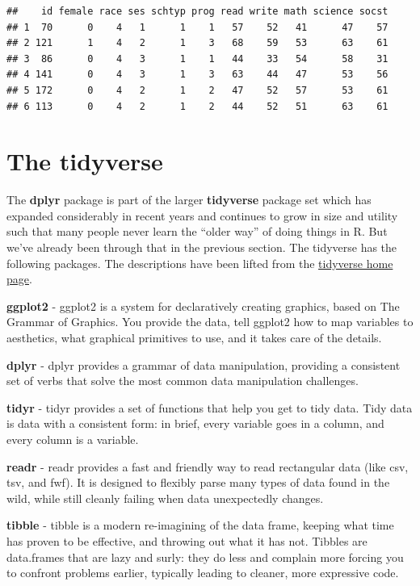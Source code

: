 \documentclass[]{book}
\begin{document}
\begin{verbatim}
##    id female race ses schtyp prog read write math science socst
## 1  70      0    4   1      1    1   57    52   41      47    57
## 2 121      1    4   2      1    3   68    59   53      63    61
## 3  86      0    4   3      1    1   44    33   54      58    31
## 4 141      0    4   3      1    3   63    44   47      53    56
## 5 172      0    4   2      1    2   47    52   57      53    61
## 6 113      0    4   2      1    2   44    52   51      63    61
\end{verbatim}

\hypertarget{the-tidyverse}{%
\chapter{The tidyverse}\label{the-tidyverse}}

The \textbf{dplyr} package is part of the larger \textbf{tidyverse} package set which has expanded considerably in recent years and continues to grow in size and utility such that many people never learn the ``older way'' of doing things in R. But we've already been through that in the previous section. The tidyverse has the following packages. The descriptions have been lifted from the \href{https://www.tidyverse.org/packages/}{tidyverse home page}.

\textbf{ggplot2} - ggplot2 is a system for declaratively creating graphics, based on The Grammar of Graphics. You provide the data, tell ggplot2 how to map variables to aesthetics, what graphical primitives to use, and it takes care of the details.

\textbf{dplyr} - dplyr provides a grammar of data manipulation, providing a consistent set of verbs that solve the most common data manipulation challenges.

\textbf{tidyr} - tidyr provides a set of functions that help you get to tidy data. Tidy data is data with a consistent form: in brief, every variable goes in a column, and every column is a variable.

\textbf{readr} - readr provides a fast and friendly way to read rectangular data (like csv, tsv, and fwf). It is designed to flexibly parse many types of data found in the wild, while still cleanly failing when data unexpectedly changes.

\textbf{tibble} - tibble is a modern re-imagining of the data frame, keeping what time has proven to be effective, and throwing out what it has not. Tibbles are data.frames that are lazy and surly: they do less and complain more forcing you to confront problems earlier, typically leading to cleaner, more expressive code.
\end{document}
